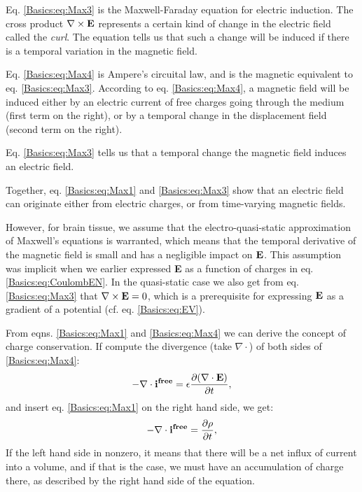 Eq. \ref{Basics:eq:Max3} is the Maxwell-Faraday equation for electric induction. The cross product $\nabla \times {\bf E}$ represents a certain kind of change in the electric field called the \textit{curl}. The equation tells us that such a change will be induced if there is a temporal variation in the magnetic field. 

Eq.  \ref{Basics:eq:Max4} is Ampere's circuital law, and is the magnetic equivalent to eq. \ref{Basics:eq:Max3}. According to eq. \ref{Basics:eq:Max4}, a magnetic field will be induced either by an electric current of free charges going through the medium (first term on the right), or by a temporal change in the displacement field (second term on the right). 


Eq. \ref{Basics:eq:Max3} tells us that a temporal change the magnetic field induces an electric field.


Together, eq. \ref{Basics:eq:Max1} and \ref{Basics:eq:Max3} show that an electric field can originate either from electric charges, or from time-varying magnetic fields. 

However, for brain tissue, we assume that the electro-quasi-static approximation of Maxwell's equations is warranted, which means that the temporal derivative of the magnetic field is small and has a negligible impact on ${\bf E}$. This assumption was implicit when we earlier expressed {\bf E} as a function of charges in eq. \ref{Basics:eq:CoulombEN}. In the quasi-static case we also get from eq. \ref{Basics:eq:Max3} that $\nabla \times {\bf E} = 0$, which is a prerequisite for expressing ${\bf E}$ as a gradient of a potential (cf. eq. \ref{Basics:eq:EV}). 

From eqns. \ref{Basics:eq:Max1} and  \ref{Basics:eq:Max4} we can derive the concept of charge conservation. If compute the divergence (take $\nabla \cdot$) of both sides of \ref{Basics:eq:Max4}:
\begin{equation}
- \nabla \cdot {\bf i^{free}} =  \epsilon \frac{\partial (\nabla \cdot {\bf E})}{\partial t}, 
\label{Basics:eq:Max4dot}
\end{equation}
and insert eq. \ref{Basics:eq:Max1} on the right hand side, we get:
\begin{equation}
- \nabla \cdot {\bf i^{free}} =  \frac{\partial \rho}{\partial t},
\label{Basics:eq:Max4dot1}
\end{equation}
If the left hand side in nonzero, it means that there will be a net influx of current into a volume, and if that is the case, we must have an accumulation of charge there, as described by the right hand side of the equation. 


